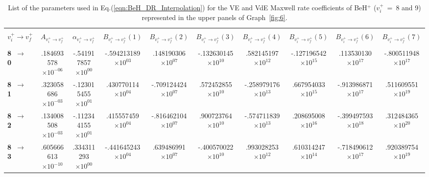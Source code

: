 \documentclass[reviewcopy]{elsarticle}
\begin{document}
\begin{landscape}
\renewcommand{\thefootnote}{\fnsymbol{footnote}}
\renewcommand{\arraystretch}{0.81}
\scriptsize
\setlength\tabcolsep{1.2ex}
\begin{longtable}{lccccccccc}
\caption[table6]{List of the parameters used in Eq.(\ref{eqn:BeH_DR_Interpolation}) for the VE and VdE Maxwell rate coefficients of BeH$^+$  ($v^+_i$~=~8 and 9) represented in the upper panels of Graph~\ref{fig:6}.}\label{tab:BeH_VE_Interpolation8-9}\vspace{0.5cm}\\
\hline \\[-2ex]
   \multicolumn{1}{c}{$v^+_i \to v^+_f$} &
   \multicolumn{1}{c}{$A_{{v^+_i}\to {v^+_f}}$} &
   \multicolumn{1}{c}{$\alpha_{{v^+_i}\to {v^+_f}}$} &
   \multicolumn{1}{c}{$B_{{v^+_i}\to {v^+_f}}(1)$} &
   \multicolumn{1}{c}{$B_{{v^+_i}\to {v^+_f}}(2)$} &
   \multicolumn{1}{c}{$B_{{v^+_i}\to {v^+_f}}(3)$} &
   \multicolumn{1}{c}{$B_{{v^+_i}\to {v^+_f}}(4)$}  &
   \multicolumn{1}{c}{$B_{{v^+_i}\to {v^+_f}}(5)$} &
   \multicolumn{1}{c}{$B_{{v^+_i}\to {v^+_f}}(6)$} &
   \multicolumn{1}{c}{$B_{{v^+_i}\to {v^+_f}}(7)$} \\[5pt]
 \hline \\[-2ex]
\endhead
{\bf 8~$\to$~ 0}  &  .184693578$\times10^{-06}$ &  -.541917857$\times10^{ 00}$ &  -.594213189$\times10^{ 03}$ &   .148190306$\times10^{ 07}$ &  -.132630145$\times10^{ 10}$ &   .582145197$\times10^{ 12}$ &  -.127196542$\times10^{ 15}$ &   .113530130$\times10^{ 17}$ &  -.800511948$\times10^{ 17}$ \\
{\bf 8~$\to$~ 1}  &  .323058686$\times10^{-03}$ &  -.123015455$\times10^{ 01}$ &   .430770114$\times10^{ 04}$ &  -.709124424$\times10^{ 07}$ &   .572452855$\times10^{ 10}$ &  -.258979176$\times10^{ 13}$ &   .667954033$\times10^{ 15}$ &  -.913986871$\times10^{ 17}$ &   .511609551$\times10^{ 19}$ \\
{\bf 8~$\to$~ 2}  &  .134008508$\times10^{-03}$ &  -.112344155$\times10^{ 01}$ &   .415557459$\times10^{ 04}$ &  -.816462104$\times10^{ 07}$ &   .900723764$\times10^{ 10}$ &  -.574711839$\times10^{ 13}$ &   .208695008$\times10^{ 16}$ &  -.399497593$\times10^{ 18}$ &   .312484365$\times10^{ 20}$ \\
{\bf 8~$\to$~ 3}  &  .605666613$\times10^{-10}$ &   .334311293$\times10^{ 00}$ &  -.441645243$\times10^{ 04}$ &   .639486991$\times10^{ 07}$ &  -.400570022$\times10^{ 10}$ &   .993028253$\times10^{ 12}$ &   .610314247$\times10^{ 14}$ &  -.718490612$\times10^{ 17}$ &   .920389754$\times10^{ 19}$ \\

\end{longtable}
\end{landscape}
\end{document}
